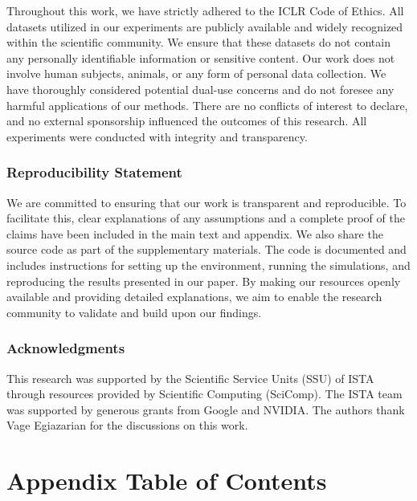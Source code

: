 \documentclass{article} %
\begin{document}
Throughout this work, we have strictly adhered to the ICLR Code of Ethics. All datasets utilized in our experiments are publicly available and widely recognized within the scientific community. We ensure that these datasets do not contain any personally identifiable information or sensitive content. Our work does not involve human subjects, animals, or any form of personal data collection. We have thoroughly considered potential dual-use concerns and do not foresee any harmful applications of our methods. There are no conflicts of interest to declare, and no external sponsorship influenced the outcomes of this research. All experiments were conducted with integrity and transparency.

\subsubsection*{Reproducibility Statement}

We are committed to ensuring that our work is transparent and reproducible.
To facilitate this, clear explanations of any assumptions and a complete proof of the claims have been included in the main text and appendix.
We also share the source code as part of the supplementary materials.
The code is documented and includes instructions for setting up the environment, running the simulations, and reproducing the results presented in our paper.
By making our resources openly available and providing detailed explanations, we aim to enable the research community to validate and build upon our findings.

\subsubsection*{Acknowledgments}

This research was supported by the Scientific Service Units (SSU) of ISTA through resources provided by Scientific Computing (SciComp). The ISTA team was supported by generous grants from Google and NVIDIA. The authors thank Vage Egiazarian for the discussions on this work.




\clearpage
\appendix

\section{Appendix Table of Contents}
\label{sec:app_toc}
\end{document}
